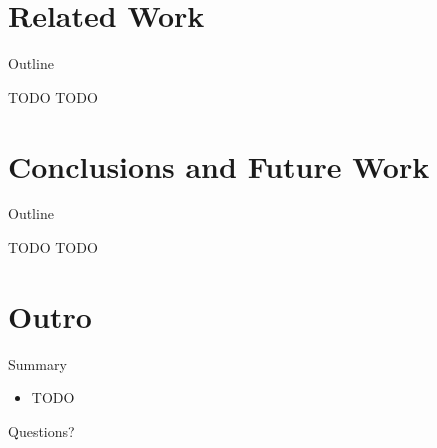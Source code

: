 \note{
}


\section{Related Work}

\begin{frame}{Outline}
  \tableofcontents[current]
\end{frame}

\note{
}

\begin{frame}{TODO}
  TODO
\end{frame}

\note{
}


\section{Conclusions and Future Work}

\begin{frame}{Outline}
  \tableofcontents[current]
\end{frame}

\note{
}

\begin{frame}{TODO}
  TODO
\end{frame}

\note{
}


\section*{Outro}

\begin{frame}{Summary}
  \begin{itemize}
  \item TODO
  \end{itemize}
\end{frame}

\note{
}

\begin{frame}
  \begin{center}
    \huge Questions?
  \end{center}
\end{frame}

\note{
}


